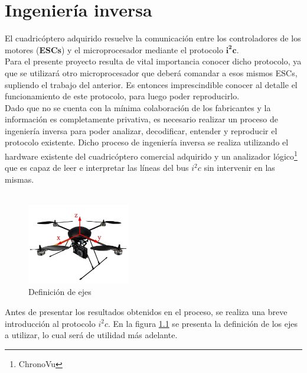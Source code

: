 \documentclass[main]{subfiles}
\begin{document}
\chapter{Ingenier\'ia inversa}

El cuadric\'optero adquirido resuelve la comunicaci\'on entre los controladores de los motores (\textbf{ESCs}) y el microprocesador mediante el protocolo $\mathbf{i^2c}$.\\

Para el presente proyecto resulta de vital importancia conocer dicho protocolo, ya que se utilizar\'a otro microprocesador que deber\'a comandar a esos mismos ESCs, supliendo el trabajo del anterior. Es entonces imprescindible conocer al detalle el funcionamiento de este protocolo, para luego poder reproducirlo.\\

Dado que no se cuenta con la mínima colaboraci\'on de los fabricantes y la informaci\'on es completamente privativa, es necesario realizar un proceso de ingenier\'ia inversa para poder analizar, decodificar, entender y reproducir el protocolo existente. Dicho proceso de ingenier\'ia inversa se realiza utilizando el hardware existente del cuadric\'optero comercial adquirido y un analizador l\'ogico\footnote{ChronoVu} que es capaz de leer e interpretar las l\'ineas del bus $i^2c$ sin intervenir en las mismas.\\ \\

\begin{figure}
	\vspace{-40pt}
	\begin{center}
	\includegraphics[width=0.4\textwidth]{./pics_sniffer/ejes_quad.jpg}
	\end{center}
	\vspace{-20pt}
	\caption{Definici\'on de ejes}
	\label{fig:ejes_quad}
	\vspace{-70pt}
\end{figure}

Antes de presentar los resultados obtenidos en el proceso, se realiza una breve introducci\'on al protocolo $i^2c$. En la figura \ref{fig:ejes_quad} se presenta la definici\'on de los ejes a utilizar, lo cual ser\'a de utilidad m\'as adelante.
\end{document}
